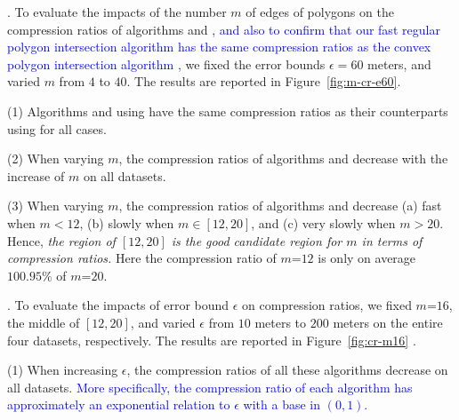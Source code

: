 {%
.
To evaluate the impacts of the number $m$ of edges of polygons on the compression ratios of algorithms \cist and \cista, 
\textcolor{blue}{and also to confirm that our fast regular polygon intersection algorithm \rpia has the same compression ratios as the convex polygon intersection algorithm \cpia, }
we fixed the error bounds {$\epsilon =60$ meters}, and varied $m$ from $4$ to $40$. The results are reported in Figure~\ref{fig:m-cr-e60}.

\ni(1) Algorithms \cist and \cista using \rpia have the same compression ratios as their counterparts using \cpia for all cases.

\ni(2) When varying $m$, the compression ratios of algorithms
{\cist and \cista} decrease with the increase of $m$ on all datasets.

\ni(3) When varying $m$, the compression ratios of algorithms {\cist and \cista} decrease (a) fast when $m < 12$, (b) slowly when $m \in [12, 20]$, and (c) very slowly when $m > 20$. Hence, \emph{the region of $[12, 20]$ is the good candidate region for $m$ in terms of compression ratios.}
Here the compression ratio of $m$=$12$ is only on average {$100.95\%$} of $m$=$20$.




.
To evaluate the impacts of error bound $\epsilon$ on compression ratios, we fixed {$m$=$16$}, the middle of $[12, 20]$, and varied $\epsilon$ from $10$ meters to $200$ meters on the entire four datasets, respectively.
The results are reported in Figure~\ref{fig:cr-m16} .


\ni (1) When increasing $\epsilon$, the compression ratios of all these algorithms decrease on all datasets. 
\textcolor{blue}{More specifically, the compression ratio of each algorithm has approximately an exponential relation to $\epsilon$ with a base in $(0,1)$.}

}
